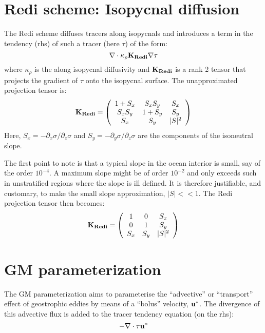 \documentclass[12pt]{article}
\begin{document}
\section{Redi scheme: Isopycnal diffusion}

The Redi scheme diffuses tracers along isopycnals and introduces a
term in the tendency (rhs) of such a tracer (here $\tau$) of the form:
\begin{equation}
\bf{\nabla} \cdot \kappa_\rho \bf{K}_{Redi}  \bf{\nabla} \tau
\end{equation}
where $\kappa_\rho$ is the along isopycnal diffusivity and
$\bf{K}_{Redi}$ is a rank 2 tensor that projects the gradient of
$\tau$ onto the isopycnal surface. The unapproximated projection tensor is:
\begin{equation}
\bf{K}_{Redi} = \left(
\begin{array}{ccc}
1 + S_x& S_x S_y & S_x \\
S_x S_y  & 1 + S_y & S_y \\
S_x & S_y & |S|^2 \\
\end{array}
\right)
\end{equation}
Here, $S_x = -\partial_x \sigma / \partial_z \sigma$ and $S_y =
-\partial_y \sigma / \partial_z \sigma$ are the components of the
isoneutral slope.

The first point to note is that a typical slope in the ocean interior
is small, say of the order $10^{-4}$. A maximum slope might be of
order $10^{-2}$ and only exceeds such in unstratified regions where
the slope is ill defined. It is therefore justifiable, and
customary, to make the small slope approximation, $|S| << 1$. The Redi
projection tensor then becomes:
\begin{equation}
\bf{K}_{Redi} = \left(
\begin{array}{ccc}
1 & 0 & S_x \\
0 & 1 & S_y \\
S_x & S_y & |S|^2 \\
\end{array}
\right)
\end{equation}


\section{GM parameterization}

The GM parameterization aims to parameterise the ``advective'' or
``transport'' effect of geostrophic eddies by means of a ``bolus''
velocity, $\bf{u}^*$. The divergence of this advective flux is added
to the tracer tendency equation (on the rhs):
\begin{equation}
- \bf{\nabla} \cdot \tau \bf{u}^*
\end{equation}
\end{document}
